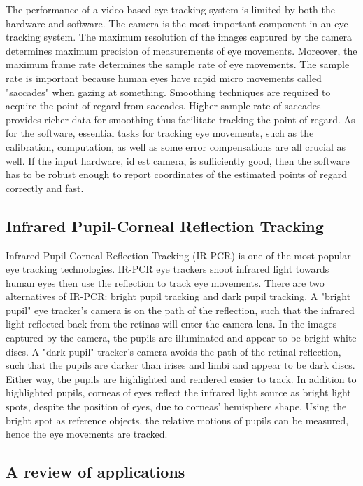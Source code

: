 \documentclass[english]{tktltiki}
\begin{document}
The performance of a video-based eye tracking system is limited by both the hardware and software. The camera is the most important component in an eye tracking system. The maximum resolution of the images captured by the camera determines maximum precision of measurements of eye movements. Moreover, the maximum frame rate determines the sample rate of eye movements. The sample rate is important because human eyes have rapid micro movements called "saccades" when gazing at something. Smoothing techniques are required to acquire the point of regard from saccades. Higher sample rate of saccades provides richer data for smoothing thus facilitate tracking the point of regard. As for the software, essential tasks for tracking eye movements, such as the calibration, computation, as well as some error compensations are all crucial as well. If the input hardware, id est camera, is sufficiently good, then the software has to be robust enough to report coordinates of the estimated points of regard correctly and fast.


\subsection{Infrared Pupil-Corneal Reflection Tracking}

Infrared Pupil-Corneal Reflection Tracking (IR-PCR) is one of the most popular eye tracking technologies. IR-PCR eye trackers shoot infrared light towards human eyes then use the reflection to track eye movements. There are two alternatives of IR-PCR: bright pupil tracking and dark pupil tracking. A "bright pupil" eye tracker's camera is on the path of the reflection, such that the infrared light reflected back from the retinas will enter the camera lens. In the images captured by the camera, the pupils are illuminated and appear to be bright white discs. A "dark pupil" tracker's camera avoids the path of the retinal reflection, such that the pupils are darker than irises and limbi and appear to be dark discs. Either way, the pupils are highlighted and rendered easier to track. In addition to highlighted pupils, corneas of eyes reflect the infrared light source as bright light spots, despite the position of eyes, due to corneas' hemisphere shape. Using the bright spot as reference objects, the relative motions of pupils can be measured, hence the eye movements are tracked.


\subsection{A review of applications}
\end{document}
